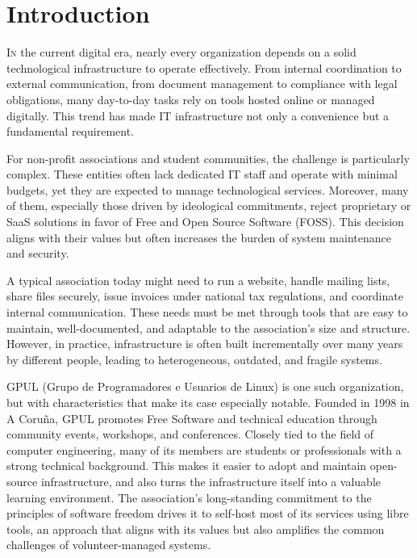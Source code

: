 %

\chapter{Introduction}
\label{chap:introduction}

\lettrine{I}{n} the current digital era, nearly every organization depends on a solid technological infrastructure to operate effectively. From internal coordination to external communication, from document management to compliance with legal obligations, many day-to-day tasks rely on tools hosted online or managed digitally. This trend has made IT infrastructure not only a convenience but a fundamental requirement.

For non-profit associations and student communities, the challenge is particularly complex. These entities often lack dedicated IT staff and operate with minimal budgets, yet they are expected to manage technological services. Moreover, many of them, especially those driven by ideological commitments, reject proprietary or SaaS solutions in favor of Free and Open Source Software (FOSS). This decision aligns with their values but often increases the burden of system maintenance and security.

A typical association today might need to run a website, handle mailing lists, share files securely, issue invoices under national tax regulations, and coordinate internal communication. These needs must be met through tools that are easy to maintain, well-documented, and adaptable to the association's size and structure. However, in practice, infrastructure is often built incrementally over many years by different people, leading to heterogeneous, outdated, and fragile systems.

GPUL (Grupo de Programadores e Usuarios de Linux) \cite{gpul_web} is one such organization, but with characteristics that make its case especially notable. Founded in 1998 in A Coruña, GPUL promotes Free Software and technical education through community events, workshops, and conferences. Closely tied to the field of computer engineering, many of its members are students or professionals with a strong technical background. This makes it easier to adopt and maintain open-source infrastructure, and also turns the infrastructure itself into a valuable learning environment. The association's long-standing commitment to the principles of software freedom drives it to self-host most of its services using libre tools, an approach that aligns with its values but also amplifies the common challenges of volunteer-managed systems.

